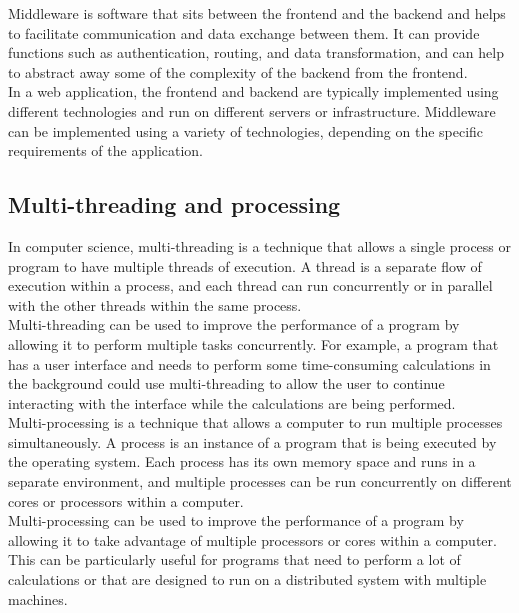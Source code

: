 \documentclass[11pt]{article}
\begin{document}
Middleware is software that sits between the frontend and the backend and helps to facilitate communication and data exchange between them. 
It can provide functions such as authentication, routing, and data transformation, and can help to abstract away some of the complexity of the backend from the frontend.\\

In a web application, the frontend and backend are typically implemented using different technologies and run on different servers or infrastructure. 
Middleware can be implemented using a variety of technologies, depending on the specific requirements of the application.\\

\subsection*{Multi-threading and processing}
\label{ap:multi_threading_and_processing}
In computer science, multi-threading is a technique that allows a single process or program to have multiple threads of execution. 
A thread is a separate flow of execution within a process, and each thread can run concurrently or in parallel with the other threads within the same process.\\

Multi-threading can be used to improve the performance of a program by allowing it to perform multiple tasks concurrently. 
For example, a program that has a user interface and needs to perform some time-consuming calculations in the background could use multi-threading to allow the user to continue interacting with the interface while the calculations are being performed.\\

Multi-processing is a technique that allows a computer to run multiple processes simultaneously. A process is an instance of a program that is being executed by the operating system. Each process has its own memory space and runs in a separate environment, and multiple processes can be run concurrently on different cores or processors within a computer.\\

Multi-processing can be used to improve the performance of a program by allowing it to take advantage of multiple processors or cores within a computer. 
This can be particularly useful for programs that need to perform a lot of calculations or that are designed to run on a distributed system with multiple machines.\\
\end{document}
